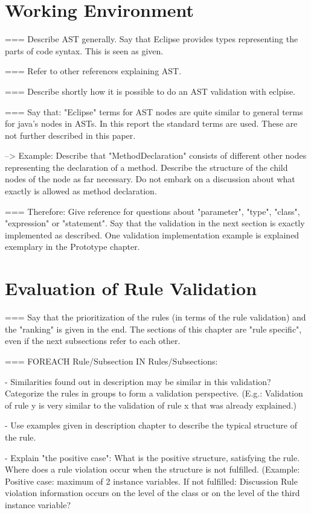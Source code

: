 \section{Working Environment}
=== Describe AST generally. Say that Eclipse provides types representing the parts of code syntax. This is seen as given. 

=== Refer to other references explaining AST.

=== Describe shortly how it is possible to do an AST validation with eclpise. 

=== Say that: "Eclipse" terms for AST nodes are quite similar to general terms for java's nodes in ASTs. In this report the standard terms are used. These are not further described in this paper.

--> Example: Describe that "MethodDeclaration" consists of different other nodes representing the declaration of a method. Describe the structure of the child nodes of the node as far necessary. Do not embark on a discussion about what exactly is allowed as method declaration. 

=== Therefore: Give reference for questions about "parameter", "type", "class", "expression" or "statement".
Say that the validation in the next section is exactly implemented as described. One validation implementation example is explained exemplary in the Prototype chapter.

\section{Evaluation of Rule Validation}
\label{e:evaluation}
=== Say that the prioritization of the rules (in terms of the rule validation) and the "ranking" is given in the end. The sections of this chapter are "rule specific", even if the next subsections refer to each other.

=== FOREACH Rule/Subsection IN Rules/Subsections:

 - Similarities found out in description may be similar in this validation? Categorize the rules in groups to form a validation perspective. (E.g.: Validation of rule y is very similar to the validation of rule x that was already explained.)
  
 - Use examples given in description chapter to describe the typical structure of the rule. 
 
 - Explain "the positive case": What is the positive structure, satisfying the rule. Where does a rule violation occur when the structure is not fulfilled. (Example: Positive case: maximum of 2 instance variables. If not fulfilled: Discussion Rule violation information occurs on the level of the class or on the level of the third instance variable?
 
